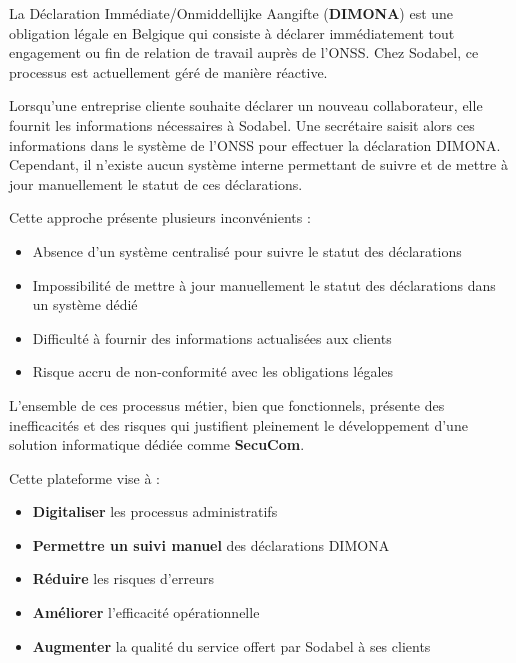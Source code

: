 La Déclaration Immédiate/Onmiddellijke Aangifte (\textbf{DIMONA}) est une obligation légale en Belgique qui consiste à déclarer immédiatement tout engagement ou fin de relation de travail auprès de l'ONSS. Chez Sodabel, ce processus est actuellement géré de manière réactive.

\noindent Lorsqu'une entreprise cliente souhaite déclarer un nouveau collaborateur, elle fournit les informations nécessaires à Sodabel. Une secrétaire saisit alors ces informations dans le système de l'ONSS pour effectuer la déclaration DIMONA. Cependant, il n'existe aucun système interne permettant de suivre et de mettre à jour manuellement le statut de ces déclarations.

\noindent Cette approche présente plusieurs inconvénients :
\begin{itemize}[leftmargin=*,label=\textcolor{darkgray}{$\bullet$},itemsep=0.3em]
  \item Absence d'un système centralisé pour suivre le statut des déclarations
  \item Impossibilité de mettre à jour manuellement le statut des déclarations dans un système dédié
  \item Difficulté à fournir des informations actualisées aux clients
  \item Risque accru de non-conformité avec les obligations légales
\end{itemize}

\vspace{1cm}

\begin{tcolorbox}[
  title={\textbf{Solution proposée : SecuCom}},
  colback=blue!5!white,
  colframe=primarycolor,
  fonttitle=\bfseries,
  boxrule=0.5mm,
  arc=2mm,
  left=6mm,
  right=6mm,
  top=6mm,
  bottom=6mm
]
\noindent L'ensemble de ces processus métier, bien que fonctionnels, présente des inefficacités et des risques qui justifient pleinement le développement d'une solution informatique dédiée comme \textbf{SecuCom}.

\noindent Cette plateforme vise à :
\begin{itemize}[leftmargin=*,label=\textcolor{darkgray}{$\bullet$},itemsep=0.3em]
  \item \textbf{Digitaliser} les processus administratifs
  \item \textbf{Permettre un suivi manuel} des déclarations DIMONA
  \item \textbf{Réduire} les risques d'erreurs
  \item \textbf{Améliorer} l'efficacité opérationnelle
  \item \textbf{Augmenter} la qualité du service offert par Sodabel à ses clients
\end{itemize}
\end{tcolorbox}
